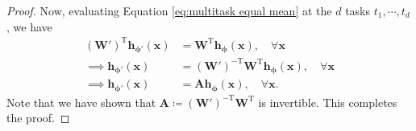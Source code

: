 \documentclass{article} %
\theoremstyle{plain}
\theoremstyle{definition}
\theoremstyle{remark}
\begin{document}
\begin{proof}
    Now, evaluating Equation \eqref{eq:multitask equal mean} at the $d$ tasks $t_1,\cdots,t_d$, we have
    \begin{align}
        (\mathbf{W}')^{\text{T}}\mathbf{h}_{\boldsymbol{\phi}'}(\mathbf{x})
        &=\mathbf{W}^{\text{T}}\mathbf{h}_{\boldsymbol{\phi}}(\mathbf{x}),\quad\forall\mathbf{x}\\
        \implies \mathbf{h}_{\boldsymbol{\phi}'}(\mathbf{x})
        &=(\mathbf{W}')^{-\text{T}}\mathbf{W}^{\text{T}}\mathbf{h}_{\boldsymbol{\phi}}(\mathbf{x}),\quad\forall\mathbf{x}\\
        \implies \mathbf{h}_{\boldsymbol{\phi}'}(\mathbf{x})
        &=\mathbf{A}\mathbf{h}_{\boldsymbol{\phi}}(\mathbf{x}),\quad\forall\mathbf{x}.
    \end{align}
    Note that we have shown that $\mathbf{A}\coloneqq(\mathbf{W}')^{-\text{T}}\mathbf{W}^{\text{T}}$ is invertible. This completes the proof.
\end{proof}
\end{document}

